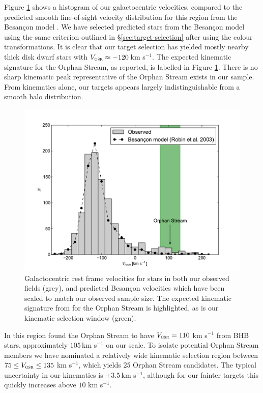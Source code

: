 \documentclass{emulateapj}
\begin{document}
Figure \ref{fig:velocities} shows a histogram of our galactocentric velocities, compared to the predicted smooth line-of-sight velocity distribution for this region from the Besan\c{c}on model \citep{Robin;et-al_2003}. We have selected predicted stars from the Besan\c{c}on model using the same criterion outlined in \S\ref{sec:target-selection} after using the \citet{Jordi;et-al_2006} colour transformations. It is clear that our target selection has yielded mostly nearby thick disk dwarf stars with $V_{\textsc{gsr}} \approx -120$\,km s$^{-1}$. The expected kinematic signature for the Orphan Stream, as \citet{Newberg;et-al_2010} reported, is labelled in Figure \ref{fig:velocities}. There is no sharp kinematic peak representative of the Orphan Stream exists in our sample. From kinematics alone, our targets appears largely indistinguishable from a smooth halo distribution.

\begin{figure}[h]
	\includegraphics[width=\columnwidth]{./figures/vgsr-histogram.pdf}
	\caption{Galactocentric rest frame velocities for stars in both our observed fields (grey), and predicted Besan\c{c}on velocities which have been scaled to match our observed sample size. The expected kinematic signature from \citet{Newberg;et-al_2010} for the Orphan Stream is highlighted, as is our kinematic selection window (green).}
	\label{fig:velocities}
\end{figure}

In this region \citet{Newberg;et-al_2010} found the Orphan Stream to have $V_{\textsc{gsr}} = 110$ km s$^{-1}$ from BHB stars, approximately $105$\,km s$^{-1}$ on our scale. To isolate potential Orphan Stream members we have nominated a relatively wide kinematic selection region between $75 \leq V_{\textsc{gsr}} \leq 135$ km s$^{-1}$, which yields 25 Orphan Stream candidates. The typical uncertainty in our kinematics is $\pm{}3.5$\,km s$^{-1}$, although for our fainter targets this quickly increases above $10$ km s$^{-1}$.
\end{document}
